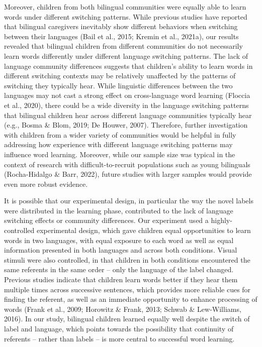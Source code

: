 \documentclass[
  man,floatsintext]{apa7}
\begin{document}
Moreover, children from both bilingual communities were equally able to learn words under different switching patterns. While previous studies have reported that bilingual caregivers inevitably show different behaviors when switching between their languages (Bail et al., 2015; Kremin et al., 2021a), our results revealed that bilingual children from different communities do not necessarily learn words differently under different language switching patterns. The lack of language community differences suggests that children's ability to learn words in different switching contexts may be relatively unaffected by the patterns of switching they typically hear. While linguistic differences between the two languages may not cast a strong effect on cross-language word learning (Floccia et al., 2020), there could be a wide diversity in the language switching patterns that bilingual children hear across different language communities typically hear (e.g., Bosma \& Blom, 2019; De Houwer, 2007). Therefore, further investigation with children from a wider variety of communities would be helpful in fully addressing how experience with different language switching patterns may influence word learning. Moreover, while our sample size was typical in the context of research with difficult-to-recruit populations such as young bilinguals (Rocha-Hidalgo \& Barr, 2022), future studies with larger samples would provide even more robust evidence.

It is possible that our experimental design, in particular the way the novel labels were distributed in the learning phase, contributed to the lack of language switching effects or community differences. Our experiment used a highly-controlled experimental design, which gave children equal opportunities to learn words in two languages, with equal exposure to each word as well as equal information presented in both languages and across both conditions. Visual stimuli were also controlled, in that children in both conditions encountered the same referents in the same order -- only the language of the label changed. Previous studies indicate that children learn words better if they hear them multiple times across successive sentences, which provides more reliable cues for finding the referent, as well as an immediate opportunity to enhance processing of words (Frank et al., 2009; Horowitz \& Frank, 2013; Schwab \& Lew-Williams, 2016). In our study, bilingual children learned equally well despite the switch of label and language, which points towards the possibility that continuity of referents -- rather than labels -- is more central to successful word learning.
\end{document}

